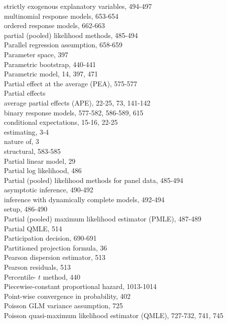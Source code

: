 \documentclass[10pt]{article}
\begin{document}
strictly exogenous explanatory variables, 494-497\\
multinomial response models, 653-654\\
ordered response models, 662-663\\
partial (pooled) likelihood methods, 485-494\\
Parallel regression assumption, 658-659\\
Parameter space, 397\\
Parametric bootstrap, 440-441\\
Parametric model, 14, 397, 471\\
Partial effect at the average (PEA), 575-577\\
Partial effects\\
average partial effects (APE), 22-25, 73, 141-142\\
binary response models, 577-582, 586-589, 615\\
conditional expectations, 15-16, 22-25\\
estimating, 3-4\\
nature of, 3\\
structural, 583-585\\
Partial linear model, 29\\
Partial log likelihood, 486\\
Partial (pooled) likelihood methods for panel data, 485-494\\
asymptotic inference, 490-492\\
inference with dynamically complete models, 492-494\\
setup, 486-490\\
Partial (pooled) maximum likelihood estimator (PMLE), 487-489\\
Partial QMLE, 514\\
Participation decision, 690-691\\
Partitioned projection formula, 36\\
Pearson dispersion estimator, 513\\
Pearson residuals, 513\\
Percentile- $t$ method, 440\\
Piecewise-constant proportional hazard, 1013-1014\\
Point-wise convergence in probability, 402\\
Poisson GLM variance assumption, 725\\
Poisson quasi-maximum likelihood estimator (QMLE), 727-732, 741, 745
\end{document}
